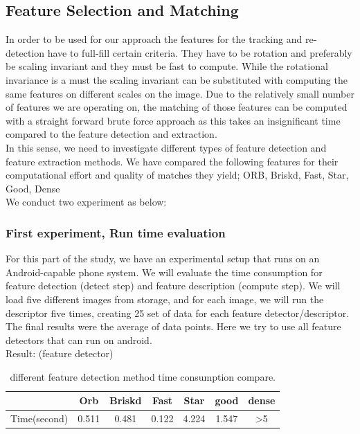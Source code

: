 \documentclass[10pt,conference,compsocconf]{IEEEtran}
\begin{document}
\subsection{Feature Selection and Matching}
In order to be used for our approach the features for the tracking and re-detection have to full-fill certain criteria. They have to be rotation and preferably be scaling invariant and they must be fast to compute. While the rotational invariance is a must the scaling invariant can be substituted with computing the same features on different scales on the image. Due to the relatively small number of features we are operating on, the matching of those features can be computed with a straight forward brute force approach as this takes an insignificant time compared to the feature detection and extraction. \\
In this sense, we need to investigate different types of feature detection and feature extraction methods. We have compared the following features for their computational effort and quality of matches they yield; ORB, Briskd, Fast, Star, Good, Dense\\
We conduct two experiment as below:

\subsubsection{First experiment, Run time evaluation}

For this part of the study, we have an experimental setup that runs on an Android-capable phone system. We will evaluate the time consumption for feature detection (detect step) and feature description (compute step). We will load five different images from storage, and for each image, we will run the descriptor five times, creating 25 set of data for each feature detector/descriptor. The final results were the average of data points. Here we try to use all feature detectors that can run on android.\\
Result: (feature detector)\\

\begin{table}[!ht]
  \centering
  \begin{tabular}{|c|c|c|c|c|c|c|}
    \hline
     & Orb&Briskd&Fast&Star&good&dense\\
    \hline
    Time(second)&0.511&0.481&0.122&4.224&1.547&\textgreater5 \\
    \hline
  \end{tabular}
  \caption{different feature detection method time consumption compare.}
\end{table}
 
\end{document}
